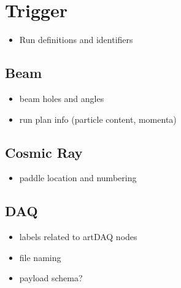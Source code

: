 \documentclass[letterpaper,twoside,onecolumn,article]{memoir}
\begin{document}
\section{Trigger}

\begin{itemize}
\item Run definitions and identifiers
\end{itemize}

\subsection{Beam}

\begin{itemize}
\item beam holes and angles
\item run plan info (particle content, momenta)
\end{itemize}

\subsection{Cosmic Ray}

\begin{itemize}
\item paddle location and numbering
\end{itemize}

\subsection{DAQ}

\begin{itemize}
\item labels related to artDAQ nodes
\item file naming
\item payload schema?
\end{itemize}
\end{document}
